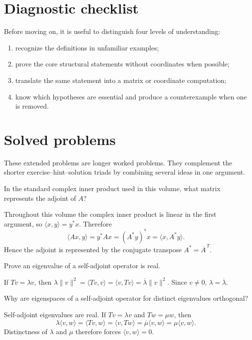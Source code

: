 \section{Diagnostic checklist}
Before moving on, it is useful to distinguish four levels of understanding:
\begin{enumerate}
\item recognize the definitions in unfamiliar examples;
\item prove the core structural statements without coordinates when possible;
\item translate the same statement into a matrix or coordinate computation;
\item know which hypotheses are essential and produce a counterexample when one is removed.
\end{enumerate}

\section{Solved problems}
These extended problems are longer worked problems. They complement the shorter exercise--hint--solution triads by combining several ideas in one argument.

\begin{problem}\label{prob:i16-problem-01}
In the standard complex inner product used in this volume, what matrix represents the adjoint of $A$?
\end{problem}
\begin{solution}
Throughout this volume the complex inner product is linear in the first argument, so $\langle x,y\rangle=y^*x$. Therefore
\[
\langle Ax,y\rangle=y^*Ax=(A^*y)^*x=\langle x,A^*y\rangle.
\]
Hence the adjoint is represented by the conjugate transpose $A^*=\overline A^{\,T}$.
\end{solution}

\begin{problem}\label{prob:i16-problem-02}
Prove an eigenvalue of a self-adjoint operator is real.
\end{problem}
\begin{solution}
If $Tv=\lambda v$, then $\lambda\|v\|^2=\langle Tv,v\rangle=\langle v,Tv\rangle=\overline\lambda\|v\|^2$. Since $v\ne0$, $\lambda=\overline\lambda$.
\end{solution}

\begin{problem}\label{prob:i16-problem-03}
Why are eigenspaces of a self-adjoint operator for distinct eigenvalues orthogonal?
\end{problem}
\begin{solution}
Self-adjoint eigenvalues are real. If $Tv=\lambda v$ and $Tw=\mu w$, then
\[
\lambda\langle v,w\rangle=\langle Tv,w\rangle=\langle v,Tw\rangle
=\overline\mu\langle v,w\rangle=\mu\langle v,w\rangle.
\]
Distinctness of $\lambda$ and $\mu$ therefore forces $\langle v,w\rangle=0$.
\end{solution}

